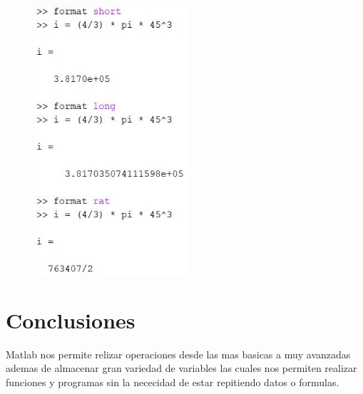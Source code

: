 \documentclass{article}
\begin{document}
\begin{enumerate}[a)]
\begin{figure}[H]
        \includegraphics[height=10cm]{img7i.jpg}
        \end{figure}
\end{enumerate}

\section{Conclusiones}

Matlab nos permite relizar operaciones desde las mas basicas a muy avanzadas ademas de almacenar gran variedad de variables las cuales nos permiten realizar funciones y programas sin la nececidad de estar repitiendo datos o formulas.
\end{document}
